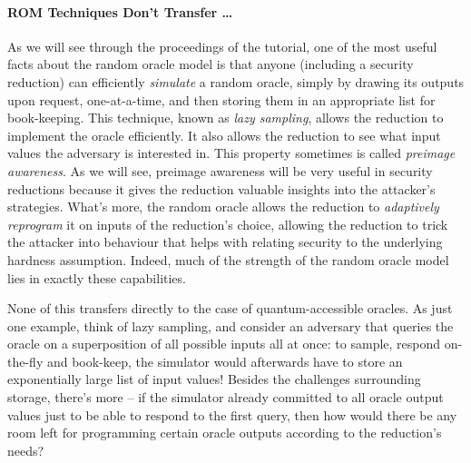   \paragraph{ROM Techniques Don't Transfer \ldots}
    As we will see through the proceedings of the tutorial,
      one of the most useful facts about the random oracle model
      is that anyone (including a security reduction)
      can efficiently \emph{simulate} a random oracle,
      simply by drawing its outputs upon request, one-at-a-time,
      and then storing them in an appropriate list for book-keeping.
      This technique, known as \emph{lazy sampling}, allows
      the reduction to implement the oracle efficiently.
      It also allows the reduction to see what input values the adversary is interested in.
      This property sometimes is called \emph{preimage awareness}.
      As we will see, preimage awareness will be very useful in security reductions
      because it gives the reduction valuable insights into the attacker's strategies.
      What's more, the random oracle allows the reduction to 
      \emph{adaptively reprogram} it on inputs of the reduction's choice,
      allowing the reduction %
      to trick the attacker into behaviour
      that helps with relating security to the underlying hardness assumption.
      Indeed, much of the strength of the random oracle model lies in exactly
      these capabilities.

    None of this transfers directly to the case of quantum-accessible oracles.
      As just one example, think of lazy sampling, and consider an adversary
      that queries the oracle on a superposition of all possible inputs all at once:
      to sample, respond on-the-fly and book-keep,
      the simulator would afterwards have to store an exponentially large list of input values!
      Besides the challenges surrounding storage, there's more --
      if the simulator already committed to all oracle output values
      just to be able to respond to the first query,
      then how would there be any room left for programming certain oracle outputs according to the reduction's needs?

